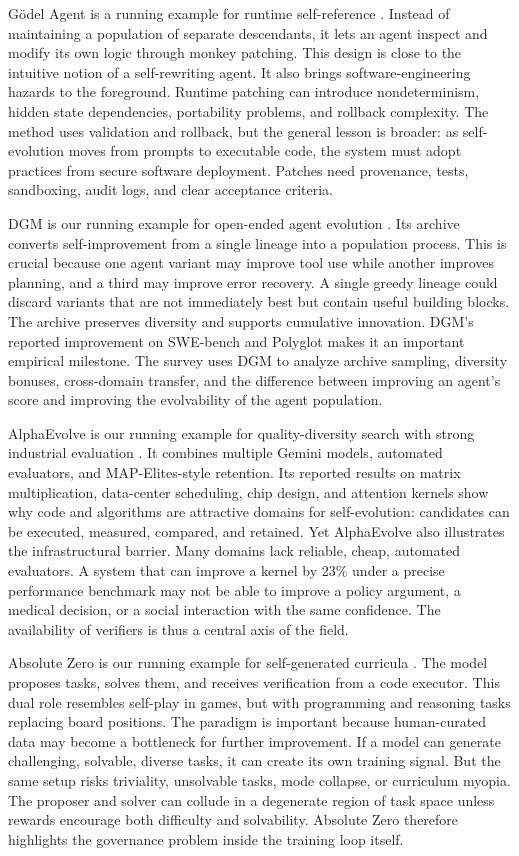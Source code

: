 G{\"o}del Agent is a running example for runtime self-reference \cite{yin2024godel}. Instead of maintaining a population of separate descendants, it lets an agent inspect and modify its own logic through monkey patching. This design is close to the intuitive notion of a self-rewriting agent. It also brings software-engineering hazards to the foreground. Runtime patching can introduce nondeterminism, hidden state dependencies, portability problems, and rollback complexity. The method uses validation and rollback, but the general lesson is broader: as self-evolution moves from prompts to executable code, the system must adopt practices from secure software deployment. Patches need provenance, tests, sandboxing, audit logs, and clear acceptance criteria.

DGM is our running example for open-ended agent evolution \cite{darwingodelmachine2025}. Its archive converts self-improvement from a single lineage into a population process. This is crucial because one agent variant may improve tool use while another improves planning, and a third may improve error recovery. A single greedy lineage could discard variants that are not immediately best but contain useful building blocks. The archive preserves diversity and supports cumulative innovation. DGM's reported improvement on SWE-bench and Polyglot makes it an important empirical milestone. The survey uses DGM to analyze archive sampling, diversity bonuses, cross-domain transfer, and the difference between improving an agent's score and improving the evolvability of the agent population.

AlphaEvolve is our running example for quality-diversity search with strong industrial evaluation \cite{alphaevolve2025}. It combines multiple Gemini models, automated evaluators, and MAP-Elites-style retention. Its reported results on matrix multiplication, data-center scheduling, chip design, and attention kernels show why code and algorithms are attractive domains for self-evolution: candidates can be executed, measured, compared, and retained. Yet AlphaEvolve also illustrates the infrastructural barrier. Many domains lack reliable, cheap, automated evaluators. A system that can improve a kernel by 23\% under a precise performance benchmark may not be able to improve a policy argument, a medical decision, or a social interaction with the same confidence. The availability of verifiers is thus a central axis of the field.

Absolute Zero is our running example for self-generated curricula \cite{absolutezero2025}. The model proposes tasks, solves them, and receives verification from a code executor. This dual role resembles self-play in games, but with programming and reasoning tasks replacing board positions. The paradigm is important because human-curated data may become a bottleneck for further improvement. If a model can generate challenging, solvable, diverse tasks, it can create its own training signal. But the same setup risks triviality, unsolvable tasks, mode collapse, or curriculum myopia. The proposer and solver can collude in a degenerate region of task space unless rewards encourage both difficulty and solvability. Absolute Zero therefore highlights the governance problem inside the training loop itself.

